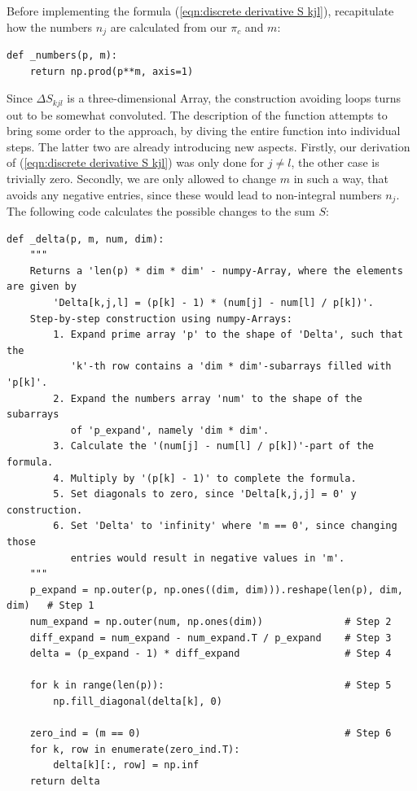 \documentclass[english, parskip=full]{scrartcl}
\begin{document}
Before implementing the formula (\ref{eqn:discrete derivative S kjl}), recapitulate how the numbers $n_j$ are calculated from our $\pi_c$ and $m$:
\begin{verbatim}
def _numbers(p, m):
    return np.prod(p**m, axis=1)
\end{verbatim}
Since $\Delta S_{kjl}$ is a three-dimensional Array, the construction avoiding loops turns out to be somewhat convoluted. The description of the function attempts to bring some order to the approach, by diving the entire function into individual steps. The latter two are already introducing new aspects. Firstly, our derivation of (\ref{eqn:discrete derivative S kjl}) was only done for $j\neq l$, the other case is trivially zero. Secondly, we are only allowed to change  $m$ in such a way, that avoids any negative entries, since these would lead to non-integral numbers $n_j$. The following code calculates the possible changes to the sum $S$: 
\begin{verbatim}
def _delta(p, m, num, dim):
    """
    Returns a 'len(p) * dim * dim' - numpy-Array, where the elements are given by 
        'Delta[k,j,l] = (p[k] - 1) * (num[j] - num[l] / p[k])'.
    Step-by-step construction using numpy-Arrays:
        1. Expand prime array 'p' to the shape of 'Delta', such that the 
           'k'-th row contains a 'dim * dim'-subarrays filled with 'p[k]'.
        2. Expand the numbers array 'num' to the shape of the subarrays 
           of 'p_expand', namely 'dim * dim'.
        3. Calculate the '(num[j] - num[l] / p[k])'-part of the formula.
        4. Multiply by '(p[k] - 1)' to complete the formula.
        5. Set diagonals to zero, since 'Delta[k,j,j] = 0' y construction.
        6. Set 'Delta' to 'infinity' where 'm == 0', since changing those 
           entries would result in negative values in 'm'.
    """
    p_expand = np.outer(p, np.ones((dim, dim))).reshape(len(p), dim, dim)   # Step 1
    num_expand = np.outer(num, np.ones(dim))              # Step 2
    diff_expand = num_expand - num_expand.T / p_expand    # Step 3
    delta = (p_expand - 1) * diff_expand                  # Step 4
    
    for k in range(len(p)):                               # Step 5
        np.fill_diagonal(delta[k], 0)
        
    zero_ind = (m == 0)                                   # Step 6
    for k, row in enumerate(zero_ind.T):
        delta[k][:, row] = np.inf
    return delta
\end{verbatim}
\end{document}
